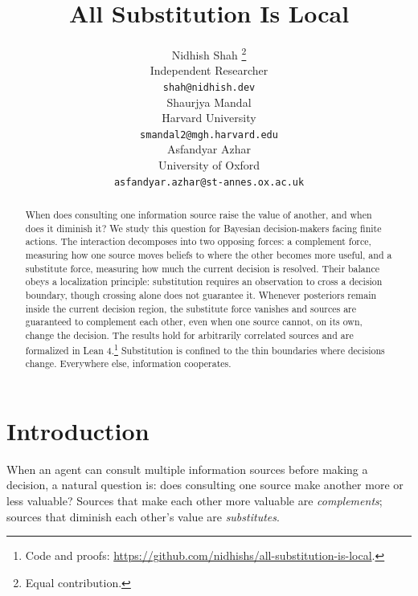 \documentclass{article}
\title{All Substitution Is Local}
\author{
    Nidhish Shah \thanks{Equal contribution.} \\
    Independent Researcher \\
    \texttt{shah@nidhish.dev} \\
\And
    Shaurjya Mandal \footnotemark[1] \\
    Harvard University \\
    \texttt{smandal2@mgh.harvard.edu} \\
\And
    Asfandyar Azhar \\
    University of Oxford \\
    \texttt{asfandyar.azhar@st-annes.ox.ac.uk} \\
}
\begin{document}
\maketitle

\begin{abstract}
When does consulting one information source raise the value of another, and when does it diminish it? We study this question for Bayesian decision-makers facing finite actions. The interaction decomposes into two opposing forces: a complement force, measuring how one source moves beliefs to where the other becomes more useful, and a substitute force, measuring how much the current decision is resolved. Their balance obeys a localization principle: substitution requires an observation to cross a decision boundary, though crossing alone does not guarantee it. Whenever posteriors remain inside the current decision region, the substitute force vanishes and sources are guaranteed to complement each other, even when one source cannot, on its own, change the decision. The results hold for arbitrarily correlated sources and are formalized in Lean 4.\footnote{Code and proofs: \url{https://github.com/nidhishs/all-substitution-is-local}.} Substitution is confined to the thin boundaries where decisions change. Everywhere else, information cooperates.
\end{abstract}

\section{Introduction}
\label{sec:intro}

When an agent can consult multiple information sources before making a decision, a natural question is: does consulting one source make another more or less valuable?
Sources that make each other more valuable are \emph{complements}; sources that diminish each other's value are \emph{substitutes}.
\end{document}
